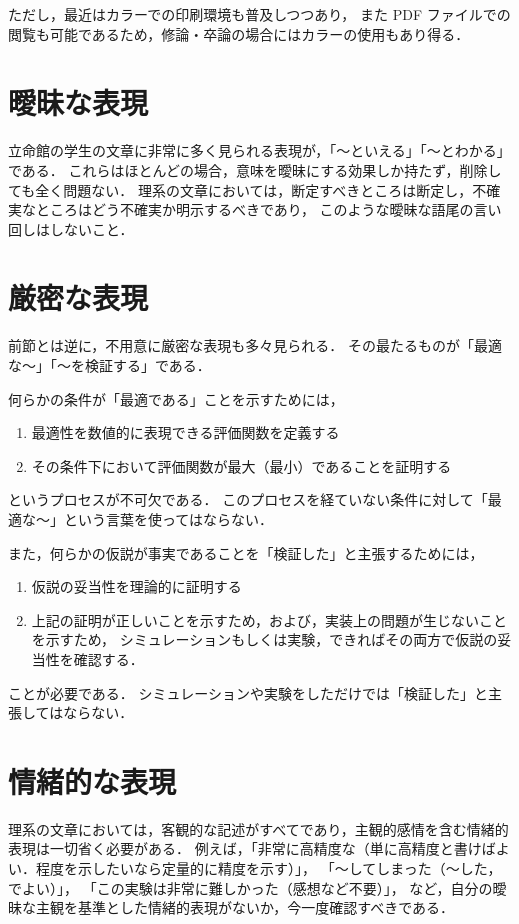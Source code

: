 ただし，最近はカラーでの印刷環境も普及しつつあり，
また PDF ファイルでの閲覧も可能であるため，修論・卒論の場合にはカラーの使用もあり得る．


\section{曖昧な表現}

立命館の学生の文章に非常に多く見られる表現が，「～といえる」「～とわかる」である．
これらはほとんどの場合，意味を曖昧にする効果しか持たず，削除しても全く問題ない．
理系の文章においては，断定すべきところは断定し，不確実なところはどう不確実か明示するべきであり，
このような曖昧な語尾の言い回しはしないこと．


\section{厳密な表現}

前節とは逆に，不用意に厳密な表現も多々見られる．
その最たるものが「最適な～」「～を検証する」である．

何らかの条件が「最適である」ことを示すためには，
\begin{enumerate}
	\item 最適性を数値的に表現できる評価関数を定義する
	\item その条件下において評価関数が最大（最小）であることを証明する
\end{enumerate}
というプロセスが不可欠である．
このプロセスを経ていない条件に対して「最適な～」という言葉を使ってはならない．

また，何らかの仮説が事実であることを「検証した」と主張するためには，
\begin{enumerate}
	\item 仮説の妥当性を理論的に証明する
	\item 上記の証明が正しいことを示すため，および，実装上の問題が生じないことを示すため，
			シミュレーションもしくは実験，できればその両方で仮説の妥当性を確認する．
\end{enumerate}
ことが必要である．
シミュレーションや実験をしただけでは「検証した」と主張してはならない．


\section{情緒的な表現}

理系の文章においては，客観的な記述がすべてであり，主観的感情を含む情緒的表現は一切省く必要がある．
例えば，「非常に高精度な（単に高精度と書けばよい．程度を示したいなら定量的に精度を示す）」，
「～してしまった（～した，でよい）」，
「この実験は非常に難しかった（感想など不要）」，
など，自分の曖昧な主観を基準とした情緒的表現がないか，今一度確認すべきである．

